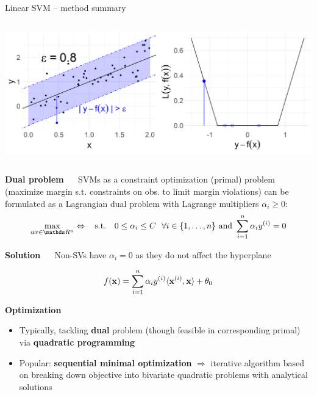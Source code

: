\documentclass[11pt,compress,t,notes=noshow, xcolor=table]{beamer}
\newcommand{\highlight}[1]{\textcolor{hlcol}{\textbf{#1}}}
\begin{document}
\begin{vbframe}{Linear SVM -- method summary}
\begin{columns}[T, totalwidth = \textwidth]
\begin{column}{0.38\textwidth}
\includegraphics[height=\textwidth, keepaspectratio=true]{
figure/loss_eps_insensitive.png}

\end{column}
\end{columns}

\medskip

\highlight{Dual problem} ~~ %
SVMs as a constraint optimization (primal) problem (maximize margin s.t. constraints on obs. to limit margin violations) can be formulated as a Lagrangian dual problem with Lagrange multipliers $\alpha_i \geq 0$: %
$$\max\limits_{\alpha v \in \R^n} \Leftrightarrow \;\; \text{ s.t. } \;\; 0 \le \alpha_i \le C ~~ \forall i \in \nset \text{ and } \sum_{i=1}^n \alpha_i \yi = 0$$


\highlight{Solution} ~~ 
Non-SVs have $\alpha_i = 0$ as they do not affect the hyperplane

$$f(\mathbf{x}) = \sum\limits_{i=1}^n \alpha_i y^{(i)} \langle \mathbf{x}^{(i)}, \mathbf{x} \rangle  + \theta_0$$

\framebreak

\highlight{Optimization}

\begin{itemize}
\item Typically, tackling \textbf{dual} problem (though feasible 
in corresponding primal) via \textbf{quadratic programming}
\item Popular: \textbf{sequential minimal optimization} $\Rightarrow$ 
iterative algorithm based on breaking down objective into bivariate quadratic 
problems with analytical solutions
\end{itemize}
\medskip


\end{vbframe}
\end{document}
